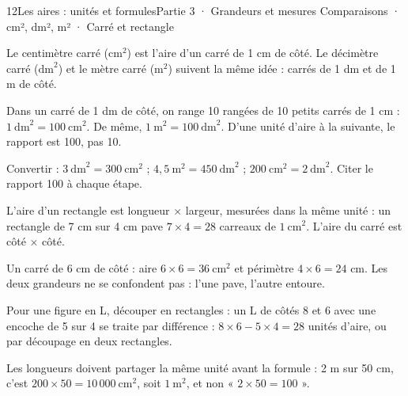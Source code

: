 \begin{ouverture}[grandeurs]{12}{Les aires : unités et formules}{Partie 3 · Grandeurs et mesures}
{Comparaisons · cm², dm², m² · Carré et rectangle}
\end{ouverture}
\pagestyle{otMain}\essentiel\fontsize{11}{15}\selectfont
{}\label{cours-12-1}
\begin{definition}Le centimètre carré ($\mathrm{cm}^2$) est l’aire d’un carré de 1 cm de côté. Le décimètre carré ($\mathrm{dm}^2$) et le mètre carré ($\mathrm m^2$) suivent la même idée : carrés de 1 dm et de 1 m de côté.\end{definition}
\label{fig-cours-12-1-cours-dm2}

\begin{propriete}Dans un carré de 1 dm de côté, on range 10 rangées de 10 petits carrés de 1 cm : $1\ \mathrm{dm}^2=100\ \mathrm{cm}^2$. De même, $1\ \mathrm m^2=100\ \mathrm{dm}^2$. D’une unité d’aire à la suivante, le rapport est 100, pas 10.\end{propriete}
\begin{savoirfaire}Convertir : $3\ \mathrm{dm}^2=300\ \mathrm{cm}^2$ ; $4{,}5\ \mathrm m^2=450\ \mathrm{dm}^2$ ; $200\ \mathrm{cm}^2=2\ \mathrm{dm}^2$. Citer le rapport 100 à chaque étape.\end{savoirfaire}
\clearpage
{}\label{cours-12-2}
\begin{propriete}L’aire d’un rectangle est longueur $\times$ largeur, mesurées dans la même unité : un rectangle de 7 cm sur 4 cm pave $7\times4=28$ carreaux de $1\ \mathrm{cm}^2$. L’aire du carré est côté $\times$ côté.\end{propriete}
\begin{exemple}Un carré de 6 cm de côté : aire $6\times6=36\ \mathrm{cm}^2$ et périmètre $4\times6=24$ cm. Les deux grandeurs ne se confondent pas : l’une pave, l’autre entoure.\end{exemple}
\begin{savoirfaire}Pour une figure en L, découper en rectangles : un L de côtés 8 et 6 avec une encoche de 5 sur 4 se traite par différence : $8\times6-5\times4=28$ unités d’aire, ou par découpage en deux rectangles.\end{savoirfaire}
\begin{attention}Les longueurs doivent partager la même unité avant la formule : 2 m sur 50 cm, c’est $200\times50=10\,000\ \mathrm{cm}^2$, soit $1\ \mathrm m^2$, et non « $2\times50=100$ ».\end{attention}

